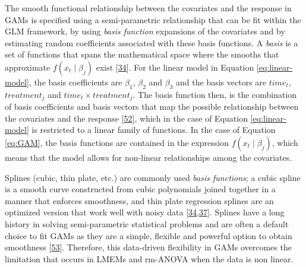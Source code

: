 \documentclass[
]{article}
\begin{document}
The smooth functional relationship between the covariates and the response in GAMs is specified using a semi-parametric relationship that can be fit within the GLM framework, by using \emph{basis function} expansions of the covariates and by estimating random coefficients associated with these basis functions. A \emph{basis} is a set of functions that spans the mathematical space where the smooths that approximate \(f(x_t\mid \beta_j)\) exist {[}\protect\hyperlink{ref-simpson2018}{34}{]}. For the linear model in Equation \eqref{eq:linear-model}, the basis coefficients are \(\beta_1\), \(\beta_2\) and \(\beta_3\) and the basis vectors are \(time_t\), \(treatment_j\) and \(time_t \times treatment_j\). The basis function then, is the combination of basis coefficients and basis vectors that map the possible relationship between the covariates and the response {[}\protect\hyperlink{ref-hefley2017}{52}{]}, which in the case of Equation \eqref{eq:linear-model} is restricted to a linear family of functions. In the case of Equation \eqref{eq:GAM}, the basis functions are contained in the expression \(f(x_t\mid \beta_j)\), which means that the model allows for non-linear relationships among the covariates.

Splines (cubic, thin plate, etc.) are commonly used \emph{basis functions}; a cubic spline is a smooth curve constructed from cubic polynomials joined together in a manner that enforces smoothness, and thin plate regression splines are an optimized version that work well with noisy data {[}\protect\hyperlink{ref-simpson2018}{34},\protect\hyperlink{ref-wood2017}{37}{]}. Splines have a long history in solving semi-parametric statistical problems and are often a default choice to fit GAMs as they are a simple, flexible and powerful option to obtain smoothness {[}\protect\hyperlink{ref-wegman1983}{53}{]}. Therefore, this data-driven flexibility in GAMs overcomes the limitation that occurs in LMEMs and rm-ANOVA when the data is non linear.
\end{document}
